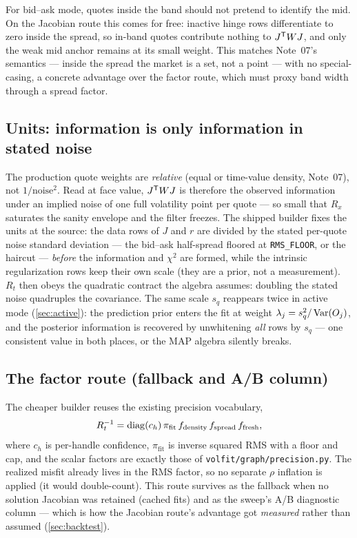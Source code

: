 \documentclass[11pt]{article}
\begin{document}
\begin{remark}
For bid--ask mode, quotes inside the band should not pretend to identify the
mid. On the Jacobian route this comes for free: inactive hinge rows
differentiate to zero inside the spread, so in-band quotes contribute nothing
to $J^{\mathsf{T}} WJ$, and only the weak mid anchor remains at its small weight. This
matches Note~07's semantics --- inside the spread the market is a set, not a
point --- with no special-casing, a concrete advantage over the factor route,
which must proxy band width through a spread factor.
\end{remark}

\subsection{Units: information is only information in stated noise}
\label{sec:units}

\begin{caution}
The production quote weights are \emph{relative} (equal or time-value
density, Note~07), not $1/\text{noise}^2$. Read at face value, $J^{\mathsf{T}} WJ$ is
therefore the observed information under an implied noise of one full
volatility point per quote --- so small that $R_x$ saturates the sanity
envelope and the filter freezes. The shipped builder fixes the units at the
source: the data rows of $J$ and $r$ are divided by the stated per-quote noise
standard deviation --- the bid--ask half-spread floored at
\texttt{RMS\_FLOOR}, or the haircut --- \emph{before} the information and
$\chi^2$ are formed, while the intrinsic regularization rows keep their own
scale (they are a prior, not a measurement). $R_t$ then obeys the quadratic
contract the algebra assumes: doubling the stated noise quadruples the
covariance. The same scale $s_q$ reappears twice in active mode
(\cref{sec:active}): the prediction prior enters the fit at weight
$\lambda_j=s_q^2/\operatorname{Var}(O_j)$, and the posterior information is recovered by
unwhitening \emph{all} rows by $s_q$ --- one consistent value in both places,
or the MAP algebra silently breaks.
\end{caution}

\subsection{The factor route (fallback and A/B column)}

The cheaper builder reuses the existing precision vocabulary,
\begin{equation}
R_t^{-1}
=\operatorname{diag}(c_h)\,
\pi_{\mathrm{fit}}\,
f_{\mathrm{density}}\,
f_{\mathrm{spread}}\,
f_{\mathrm{fresh}},
\label{eq:cheapR}
\end{equation}
where $c_h$ is per-handle confidence, $\pi_{\mathrm{fit}}$ is inverse squared
RMS with a floor and cap, and the scalar factors are exactly those of
\texttt{volfit/graph/precision.py}. The realized misfit already lives in the
RMS factor, so no separate $\rho$ inflation is applied (it would
double-count). This route survives as the fallback when no solution Jacobian
was retained (cached fits) and as the sweep's A/B diagnostic column --- which
is how the Jacobian route's advantage got \emph{measured} rather than assumed
(\cref{sec:backtest}).
\end{document}
